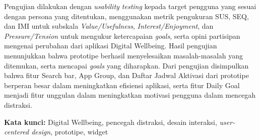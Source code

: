 \begin{singlespace}
  Pengujian dilakukan dengan \textit{usability testing} kepada target pengguna yang sesuai dengan persona yang ditentukan, menggunakan metrik pengukuran SUS, SEQ, dan IMI untuk subskala \textit{Value/Usefulness}, \textit{Interest/Enjoyment}, dan \textit{Pressure/Tension} untuk mengukur ketercapaian \textit{goals}, serta opini partisipan mengenai perubahan dari aplikasi Digital Wellbeing.
  Hasil pengujian menunjukkan bahwa prototipe berhasil menyelesaikan masalah-masalah yang ditemukan, serta mencapai \textit{goals} yang diharapkan.
  Dari pengujian disimpulkan bahwa fitur Search bar, App Group, dan Daftar Jadwal Aktivasi dari prototipe berperan besar dalam meningkatkan efisiensi aplikasi, serta fitur Daily Goal menjadi fitur unggulan dalam meningkatkan motivasi pengguna dalam mencegah distraksi.

\noindent \textbf{Kata kunci:} Digital Wellbeing, pencegah distraksi, desain interaksi, \textit{user-centered design}, prototipe, widget
\end{singlespace}